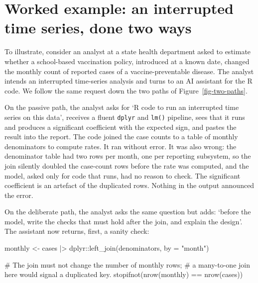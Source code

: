 \documentclass[
  letterpaper,
  11pt]{scrbook}
\newenvironment{Shaded}{\begin{snugshade}}{\end{snugshade}}
\newcommand{\AttributeTok}[1]{\textcolor[rgb]{0.40,0.45,0.13}{#1}}
\newcommand{\CommentTok}[1]{\textcolor[rgb]{0.37,0.37,0.37}{#1}}
\newcommand{\FunctionTok}[1]{\textcolor[rgb]{0.28,0.35,0.67}{#1}}
\newcommand{\NormalTok}[1]{\textcolor[rgb]{0.00,0.23,0.31}{#1}}
\newcommand{\OtherTok}[1]{\textcolor[rgb]{0.00,0.23,0.31}{#1}}
\newcommand{\SpecialCharTok}[1]{\textcolor[rgb]{0.37,0.37,0.37}{#1}}
\newcommand{\StringTok}[1]{\textcolor[rgb]{0.13,0.47,0.30}{#1}}
\begin{document}
\section{Worked example: an interrupted time series, done two
ways}\label{worked-example-an-interrupted-time-series-done-two-ways}

To illustrate, consider an analyst at a state health department asked to
estimate whether a school-based vaccination policy, introduced at a
known date, changed the monthly count of reported cases of a
vaccine-preventable disease. The analyst intends an interrupted
time-series analysis and turns to an AI assistant for the R code. We
follow the same request down the two paths of
Figure~\ref{fig-two-paths}.

On the passive path, the analyst asks for `R code to run an interrupted
time series on this data', receives a fluent \texttt{dplyr} and
\texttt{lm()} pipeline, sees that it runs and produces a significant
coefficient with the expected sign, and pastes the result into the
report. The code joined the case counts to a table of monthly
denominators to compute rates. It ran without error. It was also wrong:
the denominator table had two rows per month, one per reporting
subsystem, so the join silently doubled the case-count rows before the
rate was computed, and the model, asked only for code that runs, had no
reason to check. The significant coefficient is an artefact of the
duplicated rows. Nothing in the output announced the error.

On the deliberate path, the analyst asks the same question but adds:
`before the model, write the checks that must hold after the join, and
explain the design'. The assistant now returns, first, a sanity check:

\begin{Shaded}
\begin{Highlighting}[]
\NormalTok{monthly }\OtherTok{\textless{}{-}}\NormalTok{ cases }\SpecialCharTok{|\textgreater{}}
\NormalTok{  dplyr}\SpecialCharTok{::}\FunctionTok{left\_join}\NormalTok{(denominators, }\AttributeTok{by =} \StringTok{"month"}\NormalTok{)}

\CommentTok{\# The join must not change the number of monthly rows;}
\CommentTok{\# a many{-}to{-}one join here would signal a duplicated key.}
\FunctionTok{stopifnot}\NormalTok{(}\FunctionTok{nrow}\NormalTok{(monthly) }\SpecialCharTok{==} \FunctionTok{nrow}\NormalTok{(cases))}
\end{Highlighting}
\end{Shaded}
\end{document}
